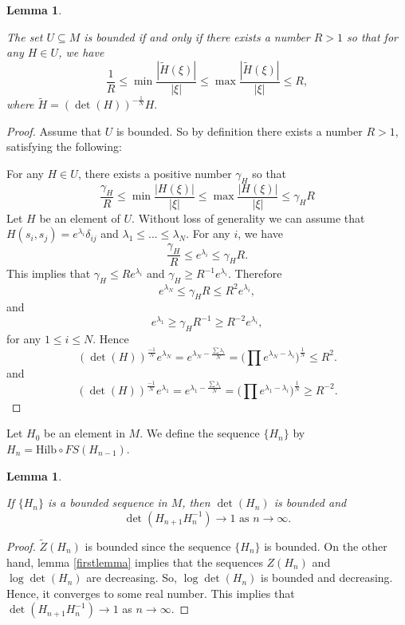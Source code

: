 \documentclass[12pt,oneside,notitlepage]{amsart}
\newtheorem{lem}[thm]{Lemma}
\theoremstyle{definition}
\theoremstyle{remark}
\numberwithin{equation}{section}
\begin{document}
\begin{lem}\label{secondlemma}

The set $U \subseteq M$ is bounded if and only if there exists a
number $R>1 $ so that for any $H \in U$, we have
$$\frac{1}{R} \leq \min \frac{|\widetilde{H}(\xi)|}{|\xi|}\leq
\max \frac{|\widetilde{H}(\xi)|}{|\xi|} \leq  R,$$ where
$\widetilde{H}=(\det(H))^{-\frac{1}{N}}H.$

\end{lem}

\begin{proof}

Assume that $U$ is bounded. So by definition there exists a number
$R>1$, satisfying the following:

For any $H \in U$, there exists a positive number $\gamma_{H}$ so
that $$\frac{\gamma_{H}}{R} \leq \min \frac{|H(\xi)|}{|\xi|}\leq
\max \frac{|H(\xi)|}{|\xi|} \leq \gamma_{H} R$$ Let $H$ be an
element of $U$. Without loss of generality we can assume that
$H(s_{i},s_{j})=e^{\lambda_{i}}\delta_{ij}$ and $\lambda_{1}\leq
...\leq \lambda_{N}.$ For any $i$, we have $$ \frac{\gamma_{H}}{R}
\leq e^{\lambda_{i}} \leq  \gamma_{H} R.$$ This implies that
$\gamma_{H} \leq R e^{\lambda_{i}}$ and $\gamma_{H} \geq R^{-1}
e^{\lambda_{i}}.$ Therefore
$$e^{\lambda_{N}}\leq \gamma_{H} R \leq R^2 e^{\lambda_{i}},$$ and
$$e^{\lambda_{1}}\geq \gamma_{H} R^{-1} \geq R^{-2} e^{\lambda_{i}},$$
for any $1 \leq i \leq N.$
Hence $$(\det(H))^{\frac{-1}{N}}
e^{\lambda_{N}}= e^{\lambda_{N}-\frac{\sum \lambda_{i}}{N}}=
\Big(\prod e^{\lambda_{N}-\lambda_{i}} \Big)^{\frac{1}{N}} \leq
R^2.
$$
and $$(\det(H))^{\frac{-1}{N}} e^{\lambda_{1}}=
e^{\lambda_{1}-\frac{\sum \lambda_{i}}{N}}= \Big(\prod
e^{\lambda_{1}-\lambda_{i}} \Big)^{\frac{1}{N}} \geq R^{-2}.
$$

\end{proof}

Let $H_{0}$ be an element in $M$. We define the sequence
$\{H_{n}\}$ by $H_{n}=\textrm{Hilb} \circ FS(H_{n-1})$.

\begin{lem}\label{thirdlemma}

If $\{H_{n}\}$ is a bounded sequence in $M$, then $\det(H_{n})$ is
bounded and
$$\det(H_{n+1}H_{n}^{-1})\rightarrow 1 \text{    as         } n\rightarrow \infty.$$

\end{lem}

\begin{proof}
$\widetilde{Z}(H_{n})$ is bounded since the sequence $\{H_{n}\}$
is bounded. On the other hand, lemma \ref{firstlemma} implies that
the sequences $Z(H_{n})$ and $\log\det(H_{n})$ are decreasing. So,
$\log\det(H_{n})$ is bounded and decreasing. Hence, it converges
to some real number. This implies that
$\det(H_{n+1}H_{n}^{-1})\rightarrow 1$ as $n\rightarrow \infty$.

\end{proof}
\end{document}
